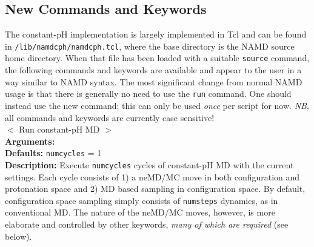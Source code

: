 \newpage
\subsection{New Commands and Keywords}

The constant-pH implementation is largely implemented in Tcl and can be found
  in \texttt{/lib/namdcph/namdcph.tcl}, where the base directory is the NAMD
  source home directory.
When that file has been loaded with a suitable \texttt{source} command, the 
  following commands and keywords are available and appear to the user in a way
  similar to NAMD syntax.
The most significant change from normal NAMD usage is that there is generally
  no need to use the \texttt{run} command.
One should instead use the new  command;
this can only be used \emph{once} per script for now.
\textit{NB}, all commands and keywords are currently case sensitive!
\\[11pt]
\noindent
{} $<$ Run constant-pH MD $>$
\\
\textbf{Arguments:} { }
\\
\textbf{Defaults:} {{\tt numcycles} = 1}
\\
\textbf{Description:}
Execute {\tt numcycles} cycles of constant-pH MD with the current settings.
Each cycle consists of 1) a neMD/MC move in both configuration and protonation
  space and 2) MD based sampling in configuration space.
By default, configuration space sampling simply consists of {\tt numsteps}
  dynamics, as in conventional MD.
The nature of the neMD/MC moves, however, is more elaborate and controlled by
  other keywords, \emph{many of which are required} (see below).

